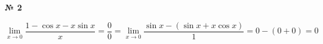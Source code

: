 \documentclass{article}
\begin{document}
\textbf{№ 2} 

\begingroup
\Large

$$ \lim\limits_{x \to 0} \frac{1-\cos{x}-x\sin{x}}{x}
= \frac{0}{0} 
= \lim\limits_{x \to 0} \frac{\sin{x} - \left(\sin{x} + x\cos{x} \right)}{1} 
= 0-(0+0) 
= 0 $$

\endgroup
\end{document}

